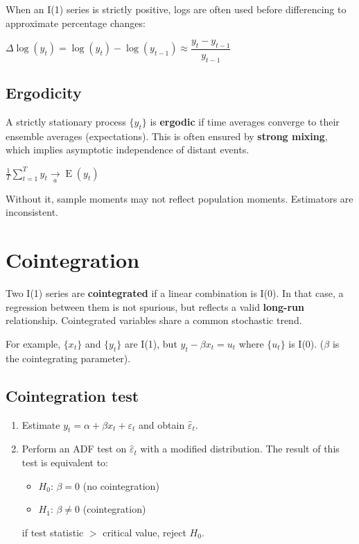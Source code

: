 \documentclass[10pt, a4paper, landscape]{article}
\DeclareMathOperator{\E}{E}
\begin{document}
\begin{multicols}{3}
When an I(1) series is strictly positive, logs are often used before differencing to approximate percentage changes:

\begin{center}
	\( \Delta \log(y_{t}) = \log(y_{t}) - \log(y_{t - 1}) \approx \dfrac{y_t - y_{t - 1}} {y_{t - 1}} \)
\end{center}

\columnbreak

\subsection*{Ergodicity}

A strictly stationary process \( \{ y_{t} \} \) is \textbf{ergodic} if time averages converge to their ensemble averages (expectations). This is often ensured by \textbf{strong mixing}, which implies asymptotic independence of distant events.

\begin{center}
	\( \frac{1}{T} \sum_{t = 1}^{T} y_{t} \underset{a}{\rightarrow} \E(y_{t}) \)
\end{center}

Without it, sample moments may not reflect population moments. Estimators are inconsistent.

\section*{Cointegration}

Two I(1) series are \textbf{cointegrated} if a linear combination is I(0). In that case, a regression between them is not spurious, but reflects a valid \textbf{long-run} relationship. Cointegrated variables share a common stochastic trend.

For example, \( \{ x_{t} \} \) and \( \{ y_{t} \} \) are I(1), but \( y_{t} - \beta x_{t} = u_{t} \) where \( \{ u_{t} \} \) is I(0). (\( \beta \) is the cointegrating parameter).

\subsection*{Cointegration test}

\begin{enumerate}[leftmargin=*]
	\item Estimate \( y_{t} = \alpha + \beta x_{t} + \varepsilon_{t} \) and obtain \( \hat{\varepsilon}_{t} \).
	\item Perform an ADF test on \( \hat{\varepsilon}_{t} \) with a modified distribution.
	The result of this test is equivalent to:
	\begin{itemize}[leftmargin=*]
		\item \( H_{0} \): \( \beta = 0 \) (no cointegration)
		\item \( H_{1} \): \( \beta \neq 0 \) (cointegration)
	\end{itemize}
	if test statistic \( > \) critical value, reject \( H_{0} \).
\end{enumerate}


\end{multicols}
\end{document}
